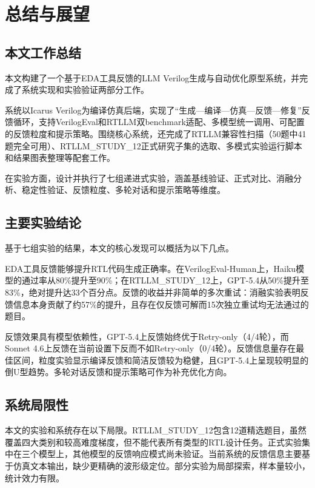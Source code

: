 \chapter{总结与展望}

\section{本文工作总结}

本文构建了一个基于EDA工具反馈的LLM Verilog生成与自动优化原型系统，并完成了系统实现和实验验证两部分工作。

系统以Icarus Verilog为编译仿真后端，实现了``生成—编译—仿真—反馈—修复''反馈循环，支持VerilogEval和RTLLM双benchmark适配、多模型统一调用、可配置的反馈粒度和提示策略。围绕核心系统，还完成了RTLLM兼容性扫描（50题中41题完全可用）、RTLLM\_STUDY\_12正式研究子集的选取、多模式实验运行脚本和结果图表整理等配套工作。

在实验方面，设计并执行了七组递进式实验，涵盖基线验证、正式对比、消融分析、稳定性验证、反馈粒度、多轮对话和提示策略等维度。

\section{主要实验结论}

基于七组实验的结果，本文的核心发现可以概括为以下几点。

EDA工具反馈能够提升RTL代码生成正确率。在VerilogEval-Human上，Haiku模型的通过率从80\%提升至90\%；在RTLLM\_STUDY\_12上，GPT-5.4从50\%提升至83\%，绝对提升达33个百分点。反馈的收益并非简单的多次重试：消融实验表明反馈信息本身贡献了约57\%的提升，且存在仅反馈可解而15次独立重试均无法通过的题目。

反馈效果具有模型依赖性，GPT-5.4上反馈始终优于Retry-only（4/4轮），而Sonnet 4.6上反馈在当前设置下反而不如Retry-only（0/4轮）。反馈信息量存在最佳区间，粒度实验显示编译反馈和简洁反馈较为稳健，且GPT-5.4上呈现较明显的倒U型趋势。多轮对话反馈和提示策略可作为补充优化方向。

\section{系统局限性}

本文的实验和系统存在以下局限。RTLLM\_STUDY\_12包含12道精选题目，虽然覆盖四大类别和较高难度梯度，但不能代表所有类型的RTL设计任务。正式实验集中在三个模型上，其他模型的反馈响应模式尚未验证。当前系统的反馈信息主要基于仿真文本输出，缺少更精确的波形级定位。部分实验为局部探索，样本量较小，统计效力有限。

